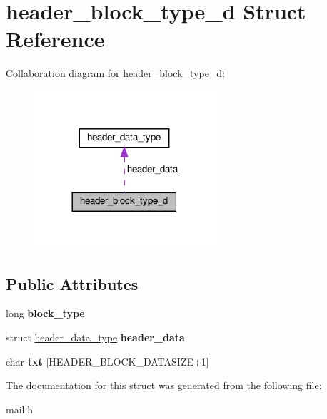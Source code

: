 \hypertarget{structheader__block__type__d}{}\section{header\+\_\+block\+\_\+type\+\_\+d Struct Reference}
\label{structheader__block__type__d}


Collaboration diagram for header\+\_\+block\+\_\+type\+\_\+d\+:
\nopagebreak
\begin{figure}[H]
\begin{center}
\leavevmode
\includegraphics[width=192pt]{structheader__block__type__d__coll__graph}
\end{center}
\end{figure}
\subsection*{Public Attributes}
\begin{DoxyCompactItemize}
\item 
\mbox{\label{structheader__block__type__d_ad6787a83675f7e68a6d29f6931d6c5ce}} 
long {\bfseries block\+\_\+type}
\item 
\mbox{\label{structheader__block__type__d_ac0db232ae99789e82a3b88798004c6d4}} 
struct \hyperlink{structheader__data__type}{header\+\_\+data\+\_\+type} {\bfseries header\+\_\+data}
\item 
\mbox{\label{structheader__block__type__d_adc6292227479941dc7e6dd2f72a30f13}} 
char {\bfseries txt} \mbox{[}H\+E\+A\+D\+E\+R\+\_\+\+B\+L\+O\+C\+K\+\_\+\+D\+A\+T\+A\+S\+I\+ZE+1\mbox{]}
\end{DoxyCompactItemize}


The documentation for this struct was generated from the following file\+:\begin{DoxyCompactItemize}
\item 
mail.\+h\end{DoxyCompactItemize}
